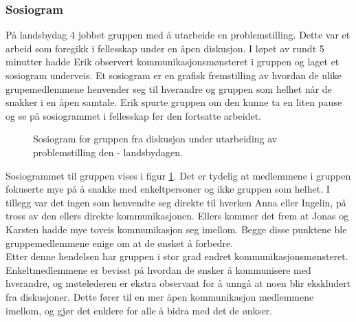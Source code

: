 \subsubsection{Sosiogram}

På landsbydag 4 jobbet gruppen med å utarbeide en problemstilling.
Dette var et arbeid som foregikk i fellesskap under en åpen diskusjon.
I løpet av rundt 5 minutter hadde Erik observert kommunikasjonsmønsteret i gruppen og laget et sosiogram underveis.
Et sosiogram er en grafisk fremstilling av hvordan de ulike grupemedlemmene henvender seg til hverandre og gruppen som helhet når de snakker i en åpen samtale.
Erik spurte gruppen om den kunne ta en liten pause og se på sosiogrammet i fellesskap før den fortsatte arbeidet.

\begin{figure}
\label{fig:sosiogram}
\caption{Sosiogram for gruppen fra diskusjon under utarbeiding av problemstilling den - landsbydagen.}
\begin{center}
\end{center}
\end{figure}

Sosiogrammet til gruppen vises i figur \ref{fig:sosiogram}. Det er tydelig at medlemmene i gruppen fokuserte mye på å snakke med enkeltpersoner og ikke gruppen som helhet.
I tillegg var det ingen som henvendte seg direkte til hverken Anna eller Ingelin, på tross av den ellers direkte kommunikasjonen.
Ellers kommer det frem at Jonas og Karsten hadde mye toveis kommunikasjon seg imellom.
Begge disse punktene ble gruppemedlemmene enige om at de ønsket å forbedre. \\

Etter denne hendelsen har gruppen i stor grad endret kommunikasjonsmønsteret.
Enkeltmedlemmene er bevisst på hvordan de ønsker å kommunisere med hverandre, og møtelederen er ekstra observant for å unngå at noen blir ekskludert fra diskusjoner.
Dette fører til en mer åpen kommunikasjon medlemmene imellom, og gjør det enklere for alle å bidra med det de ønkser. \\
